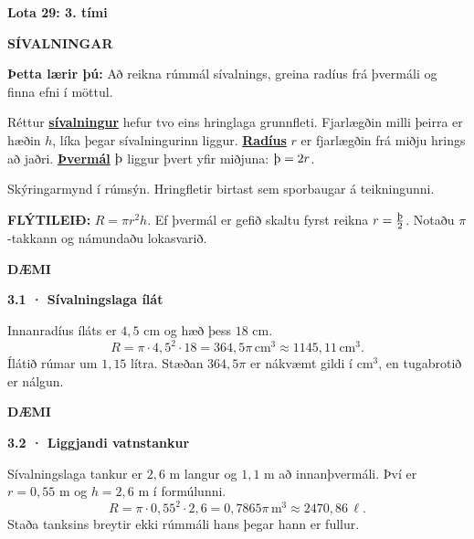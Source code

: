 \documentclass[12pt,letterpaper]{article}
\newcommand{\timi}[2]{\clearpage\phantomsection\label{timi:lota29-0#1}
\begin{center}{\large\bfseries Lota 29: #1. tími}\par\medskip
{\fontsize{20}{24}\selectfont\bfseries #2}\end{center}}
\newcommand{\kafli}[1]{\par\Needspace{5\baselineskip}{\large\bfseries #1}\par}
\newcommand{\hugtak}[2]{\hyperref[hugtak:#1]{\textbf{#2}}}
\newenvironment{daemi}[2][lotaGreen]{\par\Needspace{7\baselineskip}
\noindent\colorbox{#1}{\strut\textbf{DÆMI}}\quad\textbf{#2}\par\nopagebreak
\begin{tcolorbox}[enhanced,breakable,colback=white,colframe=#1!35!white,
boxrule=.7pt,sharp corners,left=8pt,right=8pt,top=6pt,bottom=6pt]}{\end{tcolorbox}}
\newcommand{\markmid}[1]{\textbf{Þetta lærir þú:} #1\par}
\newcommand{\eining}[1]{\,\mathrm{#1}}
\newcommand{\myndtexti}[1]{{\small #1}\par}
\begin{document}
\timi{3}{SÍVALNINGAR}
\markmid{Að reikna rúmmál sívalnings, greina radíus frá þvermáli og finna efni í möttul.}
\kafli{Hringflötur alla leið}
Réttur \hugtak{sivalningur}{sívalningur} hefur tvo eins hringlaga grunnfleti. Fjarlægðin milli þeirra er hæðin \(h\), líka þegar sívalningurinn liggur. \hugtak{radius}{Radíus} \(r\) er fjarlægðin frá miðju hrings að jaðri. \hugtak{thvermal}{Þvermál} \(\text{\th}\) liggur þvert yfir miðjuna: \(\text{\th}=2r\).
\begin{center}
\par\myndtexti{Skýringarmynd í rúmsýn. Hringfletir birtast sem sporbaugar á teikningunni.}
\end{center}
\begin{regla}\textbf{FLÝTILEIÐ:} \(R=\pi r^2h\). Ef þvermál er gefið skaltu fyrst reikna \(r=\frac{\text{\th}}{2}\). Notaðu \(\pi\)-takkann og námundaðu lokasvarið.\end{regla}
\begin{daemi}{3.1 · Sívalningslaga ílát}
Innanradíus íláts er \(4{,}5\) cm og hæð þess \(18\) cm.
\[R=\pi\cdot4{,}5^2\cdot18=364{,}5\pi\eining{cm^3}\approx1145{,}11\eining{cm^3}.\]
Ílátið rúmar um \(1{,}15\) lítra. Stæðan \(364{,}5\pi\) er nákvæmt gildi í cm\(^3\), en tugabrotið er nálgun.
\end{daemi}
\begin{daemi}[lotaCyan]{3.2 · Liggjandi vatnstankur}
Sívalningslaga tankur er \(2{,}6\) m langur og \(1{,}1\) m að innanþvermáli. Því er \(r=0{,}55\) m og \(h=2{,}6\) m í formúlunni.
\[R=\pi\cdot0{,}55^2\cdot2{,}6=0{,}7865\pi\eining{m^3}\approx2470{,}86\eining{\ell}.\]
Staða tanksins breytir ekki rúmmáli hans þegar hann er fullur.
\end{daemi}
\end{document}
